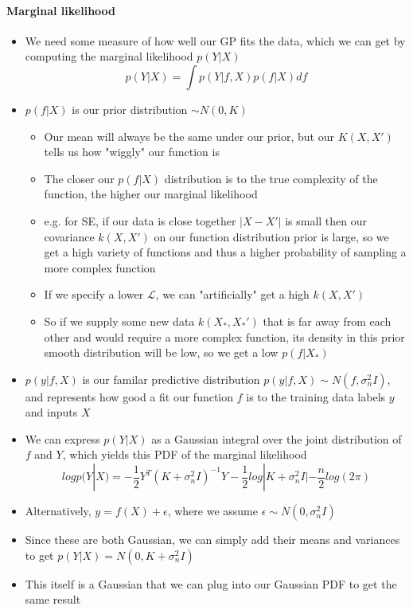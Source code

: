 \documentclass[12pt]{article}
\begin{document}
\paragraph{Marginal likelihood}
\begin{itemize}
    \item We need some measure of how well our GP fits the data, which we can get by computing the marginal likelihood $p(Y|X)$
\begin{equation}
    p(Y|X) = \int p(Y|f,X)p(f|X) df
\end{equation}
    \item $p(f|X)$ is our prior distribution $\sim N(0, K)$
    \begin{itemize}
        \item Our mean will always be the same under our prior, but our $K(X,X')$ tells us how "wiggly" our function is
        \item The closer our $p(f|X)$ distribution is to the true complexity of the function, the higher our marginal likelihood
        \item e.g. for SE, if our data is close together $|X - X'|$ is small then our covariance $k(X,X')$ on our function distribution prior is large, so we get a high variety of functions and thus a higher probability of sampling a more complex function
        \item If we specify a lower $\mathcal{L}$, we can "artificially" get a high $k(X,X')$ 
        \item So if we supply some new data $k(X_*, X_*')$ that is far away from each other and would require a more complex function, its density in this prior smooth distribution will be low, so we get a low $p(f|X_*)$
    \end{itemize}
    \item $p(y|f,X)$ is our familar predictive distribution $p(y|f,X) \sim N(f, \sigma^2_nI)$, and represents how good a fit our function $f$ is to the training data labels $y$ and inputs $X$
    \item We can express $p(Y|X)$ as a Gaussian integral over the joint distribution of $f$ and $Y$, which yields this PDF of the marginal likelihood
\begin{equation}
    log p(Y|X) = -\frac{1}{2}Y^T(K + \sigma^2_nI)^{-1}Y - \frac{1}{2}log|K + \sigma^2_nI| - \frac{n}{2}log(2\pi)
\end{equation}
    \item Alternatively, $y = f(X) + \epsilon$, where we assume $\epsilon \sim N(0, \sigma^2_nI)$
    \item Since these are both Gaussian, we can simply add their means and variances to get $p(Y|X) = N(0, K + \sigma^2_nI)$
    \item This itself is a Gaussian that we can plug into our Gaussian PDF to get the same result
\end{itemize}
\end{document}
